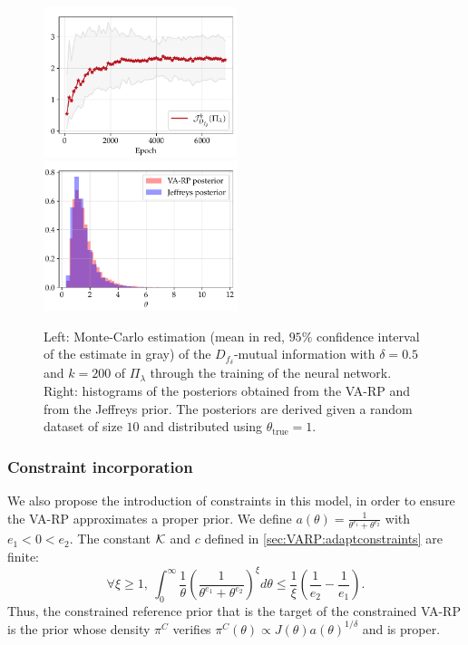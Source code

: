 \begin{figure}[h]
    \centering
    \includegraphics[width=5.625cm]{figures/va-rp/MI_normal.pdf}\hspace*{0.2cm}
    \includegraphics[width=5.625cm]{figures/va-rp/normal_post.pdf}
    \caption{Left: Monte-Carlo estimation (mean in red, $95\%$ confidence interval of the estimate in gray) of the $D_{f_\delta}$-mutual information with $\delta=0.5$ and $k=200$ of $\varPi_\lambda$ through the training of the neural network. Right: histograms of the posteriors obtained from the VA-RP and from the Jeffreys prior. The posteriors are derived given a random dataset of size $10$ and distributed using $\theta_{\text{true}}=1$.}
    \label{fig:VARP:normal-noconstr}
\end{figure}




\subsubsection{Constraint incorporation}


We also propose the introduction of constraints in this model, in order to ensure the VA-RP approximates a proper prior. We define $a(\theta)=\frac{1}{\theta^{e_1}+\theta^{e_2}}$ with $e_1<0<e_2$. The constant $\mathcal{K}$ and $c$ defined in \cref{sec:VARP:adaptconstraints} are finite:
\begin{equation}
    \forall\xi\geq1,\ \int_0^\infty\frac{1}{\theta}\left(\frac{1}{\theta^{e_1}+\theta^{e_2}}\right)^\xi d\theta \leq\frac{1}{\xi}\left(\frac{1}{e_2}-\frac{1}{e_1}\right).
\end{equation}
Thus, the constrained reference prior that is the target of the constrained VA-RP is the prior whose density $\pi^C$ verifies $\pi^C(\theta)\propto J(\theta)a(\theta)^{1/\delta}$ and is proper.


